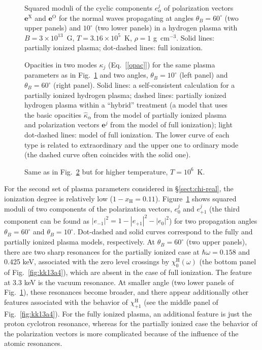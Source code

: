 \documentclass{emulateapj}
\newcommand{\gcc}{\mbox{g cm$^{-3}$}}
\newcommand{\chiH}{\chi^\mathrm{H}}
\newcommand{\eX}{\bm{e}^\mathrm{X}}
\newcommand{\eO}{\bm{e}^\mathrm{O}}
\newcommand{\xH}{x_\mathrm{H}}
\begin{document}
\begin{figure}
\caption{Squared moduli of the cyclic components $e^j_\alpha$ of
polarization vectors $\eX$ and $\eO$
for the normal waves propagating at angles $\theta_B=60^\circ$
(two upper panels) and $10^\circ$ (two lower panels)
in a hydrogen plasma
with $B=3\times10^{13}$~G, $T=3.16\times10^5$~K,
$\rho=1$ \gcc.
 Solid lines: partially ionized plasma; dot-dashed lines: full ionization.
\label{fig:kkm13a4}}
\end{figure}

\begin{figure}
\caption{Opacities in two modes $\kappa_j$ (Eq.~[\ref{opac}])
for the same plasma parameters as in Fig.~\protect\ref{fig:kkm13a4}
and two angles, $\theta_B=10^\circ$ (left panel)
and $\theta_B=60^\circ$ (right panel). 
Solid lines: a self-consistent calculation
for a partially ionized hydrogen plasma;
dashed lines: partially ionized hydrogen plasma within a ``hybrid''
treatment
(a model that uses the basic opacities $\hat\kappa_\alpha$
from the model of partially ionized plasma and polarization vectors
$\bm{e}^j$
from the model of full ionization);
light dot-dashed lines: model of full ionization.
The lower curve of each type is related to extraordinary and the upper
one to ordinary mode (the dashed curve often coincides 
with the solid one).
\label{fig:ang13a4}}
\end{figure}

\begin{figure}
\caption{Same as in Fig.~\protect\ref{fig:ang13a4}
but for higher temperature, $T=10^6$~K.
\label{fig:ang13a4b}}
\end{figure}

For the second set of plasma parameters considered in \S\ref{sect:chi-real},
the ionization degree is relatively low ($1-\xH = 0.11$).
Figure~\ref{fig:kkm13a4} shows squared moduli of two components
of the polarization vectors, $e^j_0$ and $e^j_{+1}$
(the third component can be found as $|e_{-1}|^2=1-|e_{+1}|^2-|e_0|^2$)
for two propagation angles $\theta_B=60^\circ$ and $\theta_B=10^\circ$.
Dot-dashed and solid curves correspond to the fully and partially ionized
plasma models, respectively. At $\theta_B=60^\circ$ (two upper panels), 
there are two sharp
resonances for the partially ionized case at $\hbar\omega=0.158$
and 0.425 keV, associated with the zero level crossings
by $\chiH_0(\omega)$ (the bottom panel of Fig.~\ref{fig:kk13a4}), which are 
absent in the case of full ionization. The feature at 3.3 keV
is the vacuum resonance.
At smaller angle (two lower panels of Fig.~\ref{fig:kkm13a4}), 
these resonances become broader,
and there appear additionally other features associated with the behavior
of $\chiH_{+1}$ (see the middle panel of Fig.~\ref{fig:kk13a4}).
For the fully ionized plasma, an additional feature is
just the proton cyclotron resonance, whereas for the partially ionized
case the behavior of the polarization vectors is more complicated
because of the influence of the atomic resonances.
\end{document}
